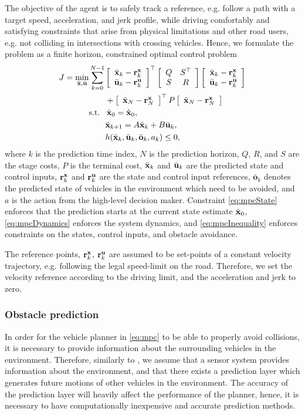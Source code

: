 The objective of the agent is to safely track a reference, e.g. follow a path with a target speed, acceleration, and jerk profile, while driving comfortably and satisfying constraints that arise from physical limitations and other road users, e.g. not colliding in intersections with crossing vehicles. Hence, we formulate  the  problem as a finite horizon, constrained optimal control problem
\begin{subequations}
	\label{eq:mpc}
	\begin{align}
	J = \min_{\bar\x,\bar\u} & \sum_{k=0}^{N-1}%
	\matr{c}{\bar\x_k - \r_k^\x \\ \bar\u_k - \r_k^\u}^\top \matr{cc}{Q &S^\top\\S & R} \matr{c}{\bar\x_k - \r_k^\x \\ \bar\u_k - \r_k^\u} \\
	&\qquad + \matr{c}{\bar\x_N - \r_N^\x}^\top P \matr{c}{\bar\x_N - \r_N^\x}\nonumber\\
	&\text{s.t.}\ \ \, \bar\x_0 = \hat{\x}_0, \label{eq:mpcState}\\
	&\qquad{}\bar\x_{k+1} = A\bar\x_{k}+B\bar\u_{k},\label{eq:mpcDynamics}\\
	&\qquad{}h(\bar\x_k,\bar\u_k,\bar{\mathbf{o}}_k,a_k) \leq{} 0, \label{eq:mpcInequality}
	\end{align}
\end{subequations}
where $k$ is  the prediction time index, $N$ is the prediction horizon, $Q$, $R$, and $S$ are the stage costs, $P$ is the terminal cost, $\bar{{\mathbf{x}}}_k$ and $ \bar{{\mathbf{u}}}_k$ are the predicted state and control inputs, ${\mathbf{r}}^{\mathbf{x}}_k$ and ${\mathbf{r}}^{\mathbf{u}}_k$ are the state and control input references, $\bar{\mathbf{o}}_k$ denotes the predicted state of vehicles in the environment which need to be avoided, and $a$ is the action from the high-level decision maker. Constraint \eqref{eq:mpcState} enforces that the prediction starts  at the current state estimate $\hat{{\mathbf{x}}}_0$, \eqref{eq:mpcDynamics} enforces the system dynamics, and \eqref{eq:mpcInequality} enforces constraints on the states, control inputs, and obstacle avoidance.

The reference points, ${\mathbf{r}}^{\mathbf{x}}_k$, ${\mathbf{r}}^{\mathbf{u}}_k$ are assumed to be set-points of a constant velocity trajectory, e.g. following the legal speed-limit on the road. Therefore, we set the velocity reference according to the driving limit, and the acceleration and jerk to zero.

\subsubsection{Obstacle prediction}
In order for the vehicle planner in \eqref{eq:mpc} to be able to properly avoid collisions, it is necessary to provide information about the surrounding vehicles in the environment. Therefore, similarly to \cite{batkovic2019}, we assume that a sensor system provides information about the environment, and that there exists a prediction layer which generates future motions of other vehicles in the environment. The accuracy of the prediction layer will heavily affect the performance of the planner, hence, it is necessary to have computationally inexpensive and accurate prediction methods.


